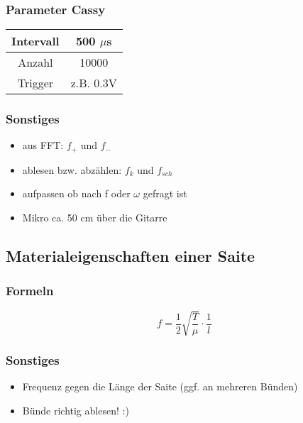 \documentclass[10pt,a4paper]{article}
\begin{document}
\subsubsection{Parameter Cassy}
\begin{table}[H]\centering
\begin{tabular}{|c|c|}
\hline 
Intervall & 500 $\mu$s \\ 
\hline 
Anzahl & 10000 \\ 
\hline 
Trigger & z.B. 0.3V \\ 
\hline 
\end{tabular} 
\end{table}
\subsubsection{Sonstiges}
\begin{itemize}
\item aus FFT: $f_+$ und $f_-$
\item ablesen bzw. abzählen: $f_{k}$ und $f_{sch}$
\item aufpassen ob nach f oder $\omega$ gefragt ist
\item Mikro ca. 50 cm über die Gitarre
\end{itemize}
\subsection{Materialeigenschaften einer Saite}
\subsubsection{Formeln}
\begin{equation}
f= \frac{1}{2}\sqrt{\frac{T}{\mu}}\cdot \frac{1}{l}
\end{equation}
\subsubsection{Sonstiges}
\begin{itemize}
\item Frequenz gegen die Länge der Saite (ggf. an mehreren Bünden)
\item Bünde richtig ablesen! :)
\end{itemize}
\end{document}

